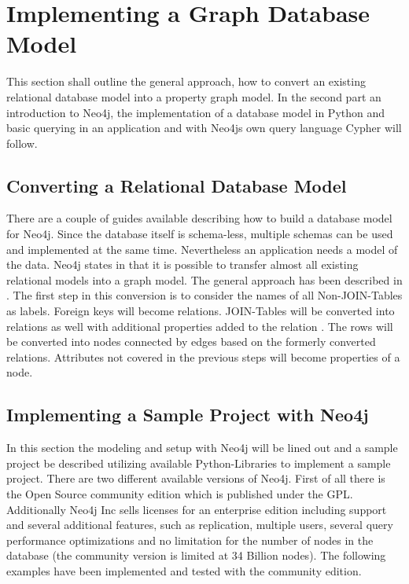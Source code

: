 \section{Implementing a Graph Database Model} \label{section3}
This section shall outline the general approach, how to convert an existing relational database model into a property graph model.
In the second part an introduction to Neo4j, the implementation of a database model in Python and basic querying in an application and with Neo4js own query language \glqq Cypher\grqq{} will follow.

\subsection{Converting a Relational Database Model}
There are a couple of guides available describing how to build a database model for Neo4j. Since the database itself is schema-less, multiple schemas can be used and implemented at the same time.
Nevertheless an application needs a model of the data.
Neo4j states in \autocite{neo4j:rel_to_graph} that it is possible to transfer almost all existing relational models into a graph model.
The general approach has been described in \autocite{dzone:rel_to_graph}.
The first step in this conversion is to consider the names of all Non-JOIN-Tables as labels.
Foreign keys will become relations.
JOIN-Tables will be converted into relations as well with additional properties added to the relation \autocite{neo4j:graph_vs_rdbms}.
The rows will be converted into nodes connected by edges based on the formerly converted relations. Attributes not covered in the previous steps will become properties of a node.

\subsection{Implementing a Sample Project with Neo4j}
In this section the modeling and setup with Neo4j will be lined out and a sample project be described utilizing available Python-Libraries to implement a sample project.
There are two different available versions of Neo4j.
First of all there is the Open Source community edition which is published under the GPL.
Additionally Neo4j Inc sells licenses for an enterprise edition \autocite{neo4j:editions} including support and several additional features, such as replication, multiple users, several query performance optimizations and no limitation for the number of nodes in the database (the community version is limited at 34 Billion nodes).
The following examples have been implemented and tested with the community edition.

